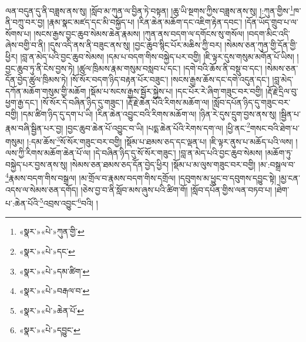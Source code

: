 ལན་བདུན་དུ་ནི་བཟླས་ནས་སུ། །སློབ་མ་ཀུན་ལ་བྱིན་ཏེ་བསྟན། །ཆུ་ཡི་སྔགས་ཀྱིས་བཟླས་ནས་སུ། །:ཀུན་གྱིས་\footnote{«སྣར་»«པེ་»ཀུན་གྱི་}ཁ་ནི་བཀྲུ་བར་བྱ། །རྣམ་སྣང་མཛད་དང་མི་བསྐྱོད་པ། །རིན་ཆེན་མཆོག་དང་འཇིག་རྟེན་དབང་། །དོན་ཡོད་གྲུབ་པ་ལ་སོགས་པ། །སངས་རྒྱས་བྱང་ཆུབ་སེམས་ཆེན་རྣམས། །ཀུན་ནས་བདག་ལ་དགོངས་སུ་གསོལ། །བདག་མིང་འདི་ཞེས་བགྱི་བ་ནི། །དུས་འདི་ནས་ནི་བཟུང་ནས་སུ། །བྱང་ཆུབ་སྙིང་པོར་མཆིས་ཀྱི་བར། །སེམས་ཅན་ཀུན་གྱི་དོན་གྱི་ཕྱིར། །བླ་ན་མེད་པའི་བྱང་ཆུབ་སེམས། །དམ་པ་བདག་གིས་བསྐྱེད་པར་བགྱི། །ཇི་ལྟར་དུས་གསུམ་མགོན་པོ་ཡིས། །བྱང་ཆུབ་ཏུ་ནི་ངེས་བྱས་ཏེ། །ཚུལ་ཁྲིམས་རྣམ་གསུམ་བསླབ་པ་དང་། །དགེ་བའི་ཆོས་ནི་བསྡུ་བ་དང་། །སེམས་ཅན་དོན་བྱེད་ཚུལ་ཁྲིམས་ཏེ། །སོ་སོར་བདག་ཉིད་བརྟན་པོར་བཟུང་། །སངས་རྒྱས་ཆོས་དང་དགེ་འདུན་དང་། །བླ་མེད་དཀོན་མཆོག་གསུམ་གྱི་མཆོག །སྡོམ་པ་སངས་རྒྱས་སྦྱོར་སྐྱེས་པ། །དང་པོར་རེ་ཞིག་གཟུང་བར་བགྱི། །རྡོ་རྗེ་དྲིལ་བུ་ཕྱག་རྒྱ་དང་། །སོ་སོར་དེ་བཞིན་ཉིད་དུ་གཟུང་། །རྡོ་རྗེ་ཆེན་པོའི་རིགས་མཆོག་ལ། །སློབ་དཔོན་ཉིད་དུ་གཟུང་བར་བགྱི། །དམ་ཚིག་ཉིད་དུ་དག་པ་ཡི། །རིན་ཆེན་འབྱུང་བའི་རིགས་མཆོག་ལ། །ཉིན་རེ་དུས་དྲུག་བྱས་ནས་སུ། །སྦྱིན་པ་རྣམ་བཞི་སྦྱིན་པར་བྱ། །བྱང་ཆུབ་ཆེན་པོ་འབྱུང་བ་ཡི། །པདྨ་ཆེན་པོའི་རེགས་དག་ལ། །ཕྱི་ནང་\footnote{«སྣར་»«པེ་»དང་}གསང་བའི་ཐེག་པ་གསུམ། །:དམ་ཆོས་\footnote{«སྣར་»«པེ་»དམ་ཚིག་}སོ་སོར་གཟུང་བར་བགྱི། །སྡོམ་པ་ཐམས་ཅད་དང་ལྡན་པ། །ཇི་ལྟར་ནུས་པ་མཆོད་པའི་ལས། །ལས་ཀྱི་རིགས་མཆོག་ཆེན་པོ་ལ། །དེ་བཞིན་ཉིད་དུ་སོ་སོར་གཟུང་། །བླ་ན་མེད་པའི་བྱང་ཆུབ་སེམས། །མཆོག་ཏུ་བསྐྱེད་པར་བྱས་ནས་སུ། །སེམས་ཅན་ཐམས་ཅད་དོན་བྱེད་ཕྱིར། །སྡོམ་པ་མ་ལུས་གཟུང་བར་བགྱི། །མ་:བསྒྲལ་བ་\footnote{«སྣར་»«པེ་»བརྒལ་བ་}རྣམས་བདག་གིས་བསྒྲལ། །མ་གྲོལ་བ་རྣམས་བདག་གིས་དགྲོལ། །དབུགས་མ་ཕྱུང་བ་དབུགས་དབྱུང་སྟེ། །མྱ་ངན་འདས་ལ་སེམས་ཅན་དགོད། །ཅེས་བྱ་བ་ནི་སློབ་མས་ཞུས་པའི་ཚིག་གོ། །སློབ་དཔོན་གྱིས་ལན་བཏབ་པ། །ཐེག་པ་:ཆེན་པོའི་\footnote{«སྣར་»«པེ་»ཆེན་པོ་}འབྲས་འབྱུང་\footnote{«སྣར་»«པེ་»དབྱུང་}བའི། །
